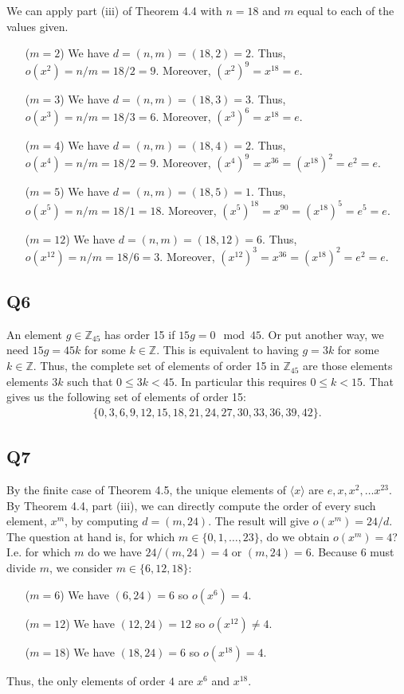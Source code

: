 \documentclass[12pt]{article}
\def\Z{{\mathbb Z}}        %
\numberwithin{theorem}{section}
\numberwithin{equation}{section}
\numberwithin{remark}{section}
\numberwithin{definition}{section}
\numberwithin{theorem}{section}
\numberwithin{lemma}{section}
\numberwithin{example}{section}
\begin{document}
We can apply part (iii) of Theorem 4.4 with $n=18$ and $m$ equal to each of the values given. 
\begin{itemize}
	\item[($m=2$)]{We have $d=(n,m)=(18,2)=2$. Thus, $o(x^2)=n/m=18/2=9$. Moreover, $(x^2)^9=x^{18}=e$.}
	\item[($m=3$)]{We have $d=(n,m)=(18,3)=3$. Thus, $o(x^3)=n/m=18/3=6$. Moreover, $(x^3)^6=x^{18}=e$.}
	\item[($m=4$)]{We have $d=(n,m)=(18,4)=2$. Thus, $o(x^4)=n/m=18/2=9$. Moreover, $(x^4)^9=x^{36}=(x^{18})^2=e^2=e$.}
	\item[($m=5$)]{We have $d=(n,m)=(18,5)=1$. Thus, $o(x^5)=n/m=18/1=18$. Moreover, $(x^5)^{18}=x^{90}=(x^{18})^5=e^5=e$.}
	\item[($m=12$)]{We have $d=(n,m)=(18,12)=6$. Thus, $o(x^{12})=n/m=18/6=3$. Moreover, $(x^{12})^3=x^{36}=(x^{18})^2=e^2=e$.}
\end{itemize}



\subsection{Q6}

An element $g\in\Z_{45}$ has order 15 if $15g=0\mod{45}$. Or put another way, we need $15g=45k$ for some $k\in\Z$. This is equivalent to having $g=3k$ for some $k\in\Z$. Thus, the complete set of elements of order 15 in $\Z_{45}$ are those elements elements $3k$ such that $0\le 3k < 45$. In particular this requires $0\le k < 15$. That gives us the following set of elements of order 15:
\begin{align*}
	\{0,3,6,9,12,15,18,21,24,27,30,33,36,39,42\}.
\end{align*}



\subsection{Q7}

By the finite case of Theorem 4.5, the unique elements of $\langle x \rangle$ are $e,x,x^2,\ldots x^{23}$. By Theorem 4.4, part (iii), we can directly compute the order of every such element, $x^m$, by computing $d=(m,24)$. The result will give $o(x^m)=24/d$. The question at hand is, for which $m\in\{0,1,\ldots,23\}$, do we obtain $o(x^m)=4$? I.e. for which $m$ do we have $24/(m,24)=4$ or $(m,24)=6$. Because $6$ must divide $m$, we consider $m\in\{6,12,18\}$:
\begin{itemize}
	\item[($m=6$)]{We have $(6,24)=6$ so $o(x^6)=4$.}
	\item[($m=12$)]{We have $(12,24)=12$ so $o(x^{12})\neq4$.}
	\item[($m=18$)]{We have $(18,24)=6$ so $o(x^{18})=4$.}
\end{itemize}
Thus, the only elements of order $4$ are $x^6$ and $x^{18}$.
\end{document}
